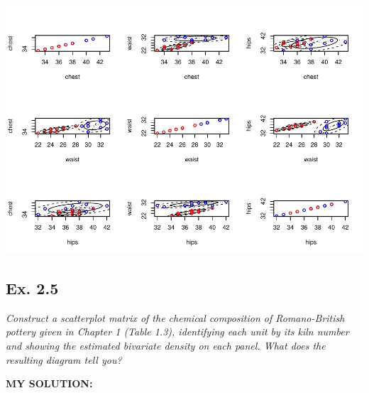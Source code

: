 \documentclass[
]{article}
\begin{document}
\includegraphics{HUDM6122-Homework_02-Chenguang-Pan_files/figure-latex/unnamed-chunk-6-1.pdf}

\hypertarget{ex.-2.5}{%
\subsection{Ex. 2.5}\label{ex.-2.5}}

\emph{Construct a scatterplot matrix of the chemical composition of
Romano-British pottery given in Chapter 1 (Table 1.3), identifying each
unit by its kiln number and showing the estimated bivariate density on
each panel. What does the resulting diagram tell you?}

\textbf{MY SOLUTION:}
\end{document}
